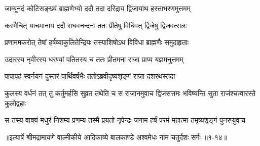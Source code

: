 \twolineshloka
{जाम्बूनदं कोटिसङ्ख्यं ब्राह्मणेभ्यो ददौ तदा}
{दरिद्राय द्विजायाथ हस्ताभरणमुत्तमम्} %

\twolineshloka
{कस्मैचित् याचमानाय ददौ राघवनन्दनः}
{ततः प्रीतेषु विधिवत् द्विजेषु द्विजवत्सलः} %

\twolineshloka
{प्रणाममकरोत् तेषां हर्षव्याकुलितेन्द्रियः}
{तस्याशिषोऽथ विविधा ब्राह्मणैः समुदाहृताः} %

\twolineshloka
{उदारस्य नृवीरस्य धरण्यां पतितस्य च}
{ततः प्रीतमना राजा प्राप्य यज्ञमनुत्तमम्} %

\twolineshloka
{पापापहं स्वर्नयनं दुस्तरं पार्थिवर्षभैः}
{ततोऽब्रवीदृष्यशृङ्गं राजा दशरथस्तदा} %

\threelineshloka
{कुलस्य वर्धनं तत् तु कर्तुमर्हसि सुव्रत}
{तथेति च स राजानमुवाच द्विजसत्तमः}
{भविष्यन्ति सुता राजंश्चत्वारस्ते कुलोद्वहाः} %

\twolineshloka
{स तस्य वाक्यं मधुरं निशम्य प्रणम्य तस्मै प्रयतो नृपेन्द्रः}
{जगाम हर्षं परमं महात्मा तमृष्यशृङ्गं पुनरप्युवाच} %


॥इत्यार्षे श्रीमद्रामायणे वाल्मीकीये आदिकाव्ये बालकाण्डे अश्वमेधः नाम चतुर्दशः सर्गः ॥१-१४॥
